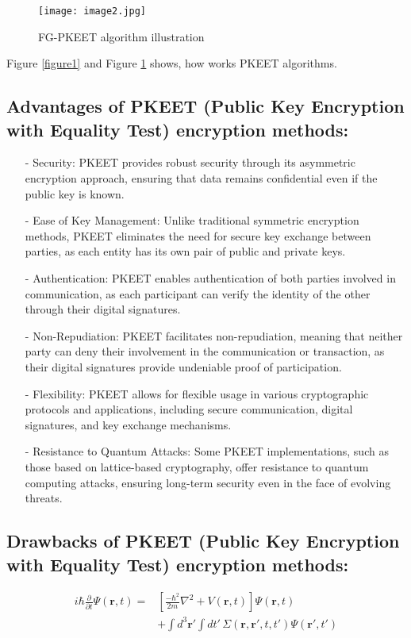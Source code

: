\documentclass[12pt]{article}
\begin{document}
\begin{figure}[H]
    \centering
    \texttt{[image: image2.jpg]}
    \caption{FG-PKEET algorithm illustration}
    \label{figure2}
\end{figure}
Figure \ref{figure1} and Figure \ref{figure2} shows, how works PKEET algorithms.
\subsection{Advantages of PKEET (Public Key Encryption with Equality Test) encryption methods:}

\begin{itemize}
    \item [-]Security: PKEET provides robust security through its asymmetric encryption approach, ensuring that data remains confidential even if the public key is known.
    \item [-]Ease of Key Management: Unlike traditional symmetric encryption methods, PKEET eliminates the need for secure key exchange between parties, as each entity has its own pair of public and private keys.
    \item [-]Authentication: PKEET enables authentication of both parties involved in communication, as each participant can verify the identity of the other through their digital signatures.
    \item[-]Non-Repudiation: PKEET facilitates non-repudiation, meaning that neither party can deny their involvement in the communication or transaction, as their digital signatures provide undeniable proof of participation.
    \item[-]Flexibility: PKEET allows for flexible usage in various cryptographic protocols and applications, including secure communication, digital signatures, and key exchange mechanisms.
    \item[-]Resistance to Quantum Attacks: Some PKEET implementations, such as those based on lattice-based cryptography, offer resistance to quantum computing attacks, ensuring long-term security even in the face of evolving threats.
    
\end{itemize}

\subsection{Drawbacks of PKEET (Public Key Encryption with Equality Test) encryption methods:} 


\begin{equation*}
\begin{split}
i\hbar\frac{\partial}{\partial t}\Psi(\mathbf{r},t) = & \left[ \frac{-\hbar^2}{2m}\nabla^2 + V(\mathbf{r},t) \right] \Psi(\mathbf{r},t) \\
 &+ \int d^3\mathbf{r}' \int dt' \, \Sigma(\mathbf{r},\mathbf{r}',t,t') \Psi(\mathbf{r}',t') 
\end{split}
\end{equation*}
\end{document}
